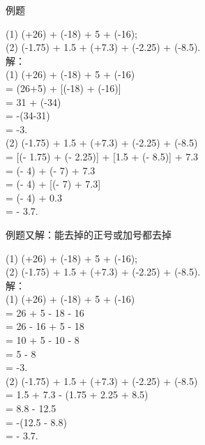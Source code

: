 \begin{frame}[t]{例题}
\begin{spacing}{1.1} %
(1) (+26) + (-18) + 5 + (-16); \\
(2) (-1.75) + 1.5 + (+7.3) + (-2.25) + (-8.5). \\
\pause
解：\\
(1) (+26) + (-18) + 5 + (-16) \\
= (26+5) + [(-18) + (-16)] \\
= 31 + (-34) \\
= -(34-31) \\
= -3. \\
(2) (-1.75) + 1.5 + (+7.3) + (-2.25) + (-8.5) \\
= [(- 1.75) + (- 2.25)] + [1.5 + (- 8.5)] + 7.3 \\
= (- 4) + (- 7) + 7.3 \\
= (- 4) + [(- 7) + 7.3] \\
= (- 4) + 0.3 \\
= - 3.7.
\end{spacing}
\end{frame}

\begin{frame}[t]{例题又解：能去掉的正号或加号都去掉}
\begin{spacing}{1.1} %
(1) (+26) + (-18) + 5 + (-16); \\
(2) (-1.75) + 1.5 + (+7.3) + (-2.25) + (-8.5). \\
\pause
解：\\
(1) (+26) + (-18) + 5 + (-16) \\
= 26 + 5 - 18 - 16 \\
= 26 - 16 + 5 - 18 \\
= 10 + 5 - 10 - 8 \\
= 5 - 8 \\
= -3. \\
(2) (-1.75) + 1.5 + (+7.3) + (-2.25) + (-8.5) \\
= 1.5 + 7.3 - (1.75 + 2.25 + 8.5) \\
= 8.8 - 12.5\\
= -(12.5 - 8.8)\\
= - 3.7.
\end{spacing}
\end{frame}
